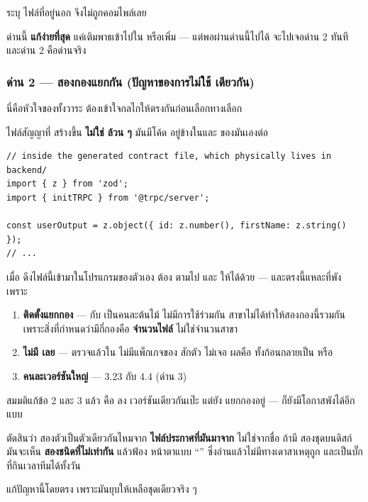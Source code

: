  ระบุ  ไฟล์ที่อยู่นอก  จึงไม่ถูกคอมไพล์เลย

ด่านนี้ \textbf{แก้ง่ายที่สุด} แค่เติมพาธเข้าไปใน  หรือเพิ่ม
 --- แต่พอผ่านด่านนี้ไปได้ จะไปเจอด่าน 2 ทันที และด่าน 2 คือด่านจริง

\subsubsection{ด่าน 2 ---  สองกองแยกกัน (ปัญหาของการไม่ใช้  เดียวกัน)}

นี่คือหัวใจของทั้งวาระ ต้องเข้าใจกลไกให้ตรงกันก่อนเลือกทางเลือก

ไฟล์สัญญาที่  สร้างขึ้น \textbf{ไม่ใช่  ล้วน ๆ} มันมีโค้ด
 อยู่ข้างในและ  ของมันเองต่อ

\begin{lstlisting}
// inside the generated contract file, which physically lives in backend/
import { z } from 'zod';
import { initTRPC } from '@trpc/server';

const userOutput = z.object({ id: z.number(), firstName: z.string() });
// ...
\end{lstlisting}

เมื่อ  ดึงไฟล์นี้เข้ามาในโปรแกรมของตัวเอง  ต้อง
ตามไป   และ  ให้ได้ด้วย ---
และตรงนี้แหละที่พัง เพราะ

\begin{enumerate}
\item \textbf{ ติดตั้งแยกกอง} ---  กับ
       เป็นคนละต้นไม้ ไม่มีการใช้ร่วมกัน
       สาขาไม่ได้ทำให้สองกองนี้รวมกัน เพราะสิ่งที่กำหนดว่ามีกี่กองคือ
      \textbf{จำนวนไฟล์ } ไม่ใช่จำนวนสาขา
\item \textbf{ ไม่มี  เลย} --- ตรวจแล้วใน
       ไม่มีแพ็กเกจของ  สักตัว
       ไม่เจอ ผลคือ  ทั้งก้อนกลายเป็น  หรือ
\item \textbf{ คนละเวอร์ชันใหญ่} --- 3.23 กับ 4.4 (ด่าน 3)
\end{enumerate}

\begin{warnbox}[title={อาการเฉพาะที่ควรจำไว้: ``\en{Type} X ใช้แทน \en{Type} X ไม่ได้''}]
สมมติแก้ข้อ 2 และ 3 แล้ว คือ  ลง  เวอร์ชันเดียวกันเป๊ะ
แต่ยัง  แยกกองอยู่ --- ก็ยังมีโอกาสพังได้อีกแบบ

 ตัดสินว่า  สองตัวเป็นตัวเดียวกันไหมจาก
\textbf{ไฟล์ประกาศที่มันมาจาก} ไม่ใช่จากชื่อ ถ้ามี  สองชุดบนดิสก์
มันจะเห็น  \textbf{สองชนิดที่ไม่เท่ากัน} แล้วฟ้อง 
หน้าตาแบบ ``''
ซึ่งอ่านแล้วไม่มีทางเดาสาเหตุถูก และเป็นบั๊กที่กินเวลาทีมได้ทั้งวัน

 แก้ปัญหานี้โดยตรง เพราะมันยุบให้เหลือชุดเดียวจริง ๆ
\end{warnbox}

